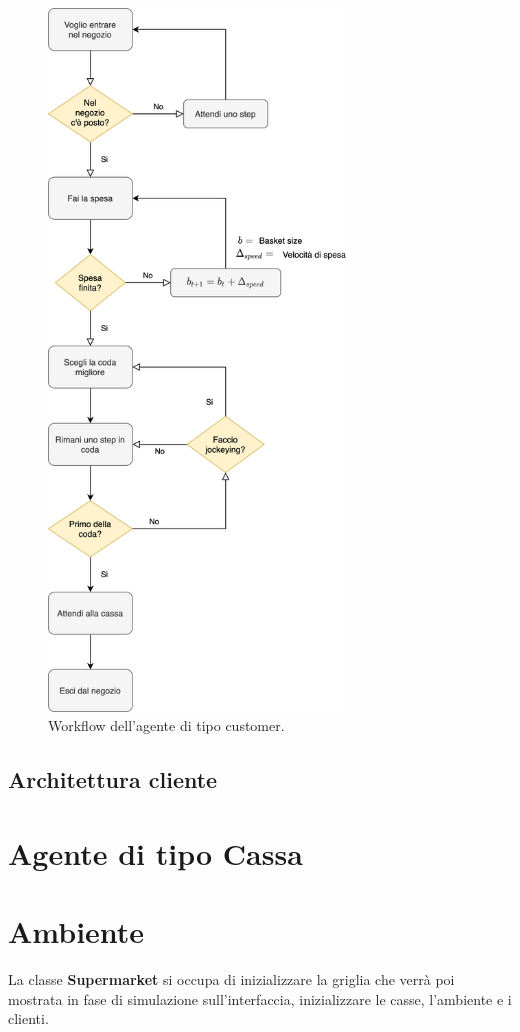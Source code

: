 \begin{figure}[htp!]
	\centering
	\hspace*{3cm}
	\includegraphics[width=8cm]{"images/workflow_customer.png"}
	\caption{Workflow dell'agente di tipo customer.}
	\label{fig:workflow_customer}
\end{figure}


\subsection{Architettura cliente}


\section{Agente di tipo Cassa}


\section{Ambiente}
La classe \textbf{Supermarket} si occupa di inizializzare la griglia che verrà poi mostrata in fase di simulazione sull'interfaccia, inizializzare le casse, l'ambiente e i clienti.

